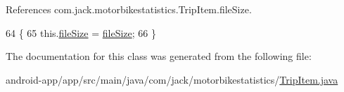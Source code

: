 References com.\+jack.\+motorbikestatistics.\+Trip\+Item.\+file\+Size.


\begin{DoxyCode}
64                                           \{
65         this.\hyperlink{classcom_1_1jack_1_1motorbikestatistics_1_1_trip_item_ac7b1106a5db61eb17cfd3f314a885a3d}{fileSize} = \hyperlink{classcom_1_1jack_1_1motorbikestatistics_1_1_trip_item_ac7b1106a5db61eb17cfd3f314a885a3d}{fileSize};
66     \}
\end{DoxyCode}


The documentation for this class was generated from the following file\+:\begin{DoxyCompactItemize}
\item 
android-\/app/app/src/main/java/com/jack/motorbikestatistics/\hyperlink{_trip_item_8java}{Trip\+Item.\+java}\end{DoxyCompactItemize}
